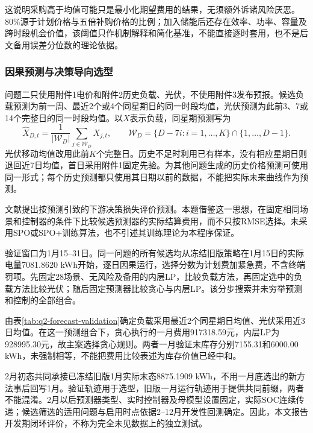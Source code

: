 这说明采购高于均值可能只是最小化期望费用的结果，无须额外诉诸风险厌恶。80\%源于计划价格与五倍补购价格的比例；加入储能后还存在效率、功率、容量及跨时段机会价值，该阈值只作机制解释和简化基准，不能直接逐时套用，也不是后文备用误差分位数的理论依据。

\subsubsection{因果预测与决策导向选型}

问题二只使用附件1电价和附件2历史负载、光伏，不使用附件3发布预报。候选负载预测为前一周、最近2个或4个同星期日的同一时段均值，光伏预测为此前3、7或14个完整日的同一时段均值。以$X$表示负载，同星期预测写为
\begin{equation}
 \widehat X_{D,t}=\frac{1}{|\mathcal W_D|}\sum_{j\in\mathcal W_D}X_{j,t},\qquad
 \mathcal W_D=\{D-7i:i=1,\ldots,K\}\cap\{1,\ldots,D-1\}.
 \label{eq:weekday_forecast}
\end{equation}
光伏移动均值改用此前$K$个完整日。历史不足时利用已有样本，没有相应星期日则退回近7日均值，首日采用附件1固定先验。为其他问题生成的历史价格预测可使用同一形式；每个历史预测都只使用其日期以前的数据，不能把实际未来曲线作为预测。

文献\cite{elmachtoub2017spo}提出按预测引致的下游决策损失评价预测。本题借鉴这一思想，在固定相同场景和控制器的条件下比较候选预测器的实际结算费用，而不只按RMSE选择。未采用SPO或SPO+训练算法，也不引述其训练理论为本程序保证。

验证窗口为1月15--31日。同一问题的所有候选均从冻结旧版策略在1月15日的实际电量7081.8620 kWh开始，逐日因果运行，选择分数为计划费加紧急费，不含终端罚项。先固定28场景、无风险及备用的内层LP，比较负载方法，再固定选中的负载方法比较光伏；随后固定预测器比较贪心与内层LP。该分步搜索并未穷举预测和控制的全部组合。



由表\ref{tab:q2-forecast-validation}确定负载采用最近2个同星期日均值、光伏采用近3日均值。在这一预测组合下，贪心执行的一月费用917318.59元，内层LP为928995.30元，故主案选择贪心规则。两者一月验证末库存分别7155.31和6000.00 kWh，未强制相等，不能把费用比较表述为库存价值已经中和。

2月初态共同承接已冻结旧版1月实际末态8875.1909 kWh，不用一月底选出的新方法事后回写1月。验证轨迹用于选型，旧版一月运行轨迹用于提供共同前缀，两者不能混淆。2月以后预测器类型、实时控制器及母模型设置固定，实际SOC连续传递；候选筛选的适用问题与启用时点依据2--12月开发性回测确定。因此，本文报告开发期闭环评价，不称为完全未见数据上的独立测试。

